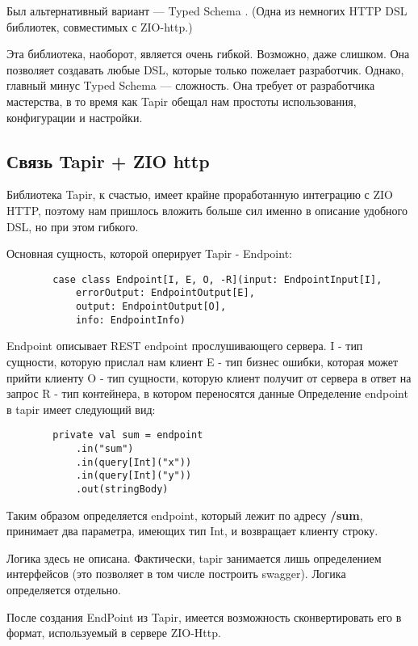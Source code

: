 \documentclass[14pt]{extarticle}
\begin{document}
    Был альтернативный вариант --- Typed Schema \cite{ts}. (Одна из немногих HTTP DSL библиотек, совместимых с ZIO-http.)

    Эта библиотека, наоборот, является очень гибкой. Возможно, даже слишком. Она позволяет создавать любые DSL,
    которые только пожелает разработчик. Однако, главный минус Typed Schema --- сложность. Она требует от разработчика
    мастерства, в то время как Tapir обещал нам простоты использования, конфигурации и настройки.
    \newpage
    \subsection{Связь Tapir + ZIO http}

    Библиотека Tapir, к счастью, имеет крайне проработанную интеграцию с ZIO HTTP, поэтому нам пришлось вложить
    больше сил именно в описание удобного DSL, но при этом гибкого.

    Основная сущность, которой оперирует Tapir - Endpoint:
    \begin{verbatim}
        case class Endpoint[I, E, O, -R](input: EndpointInput[I],
            errorOutput: EndpointOutput[E],
            output: EndpointOutput[O],
            info: EndpointInfo)
    \end{verbatim}

    Endpoint описывает REST endpoint прослушивающего сервера.
    I - тип сущности, которую прислал нам клиент
    E - тип бизнес ошибки, которая может прийти клиенту
    O - тип сущности, которую клиент получит от сервера в ответ на запрос
    R - тип контейнера, в котором переносятся данные
    Определение endpoint в tapir имеет следующий вид:
    \begin{verbatim}
        private val sum = endpoint
            .in("sum")
            .in(query[Int]("x"))
            .in(query[Int]("y"))
            .out(stringBody)
    \end{verbatim}

    Таким образом определяется endpoint, который лежит по адресу \textbf{/sum}, принимает два параметра, имеющих тип
    Int, и
    возвращает клиенту строку.

    Логика здесь не описана. Фактически, tapir занимается лишь определением интерфейсов (это позволяет в том числе
    построить swagger).
    Логика определяется отдельно.

    После создания EndPoint из Tapir, имеется возможность сконвертировать его в формат,
    используемый в сервере ZIO-Http.
\end{document}

